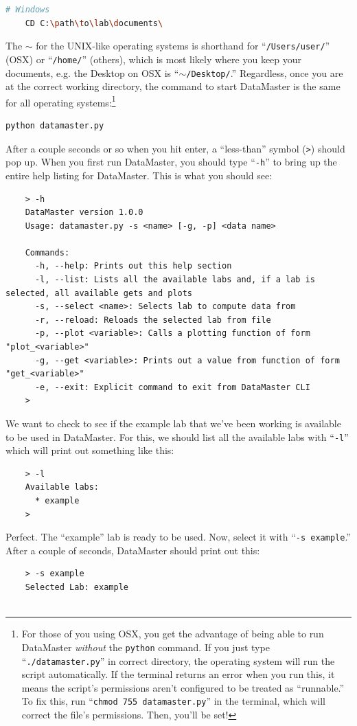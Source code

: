 \documentclass[12pt]{article}
\begin{document}
{\begin{framed}
\begin{lstlisting}[language=sh]
    # Windows
    CD C:\path\to\lab\documents\
  \end{lstlisting}
\end{framed}
The $\sim$ for the UNIX-like operating systems is shorthand for ``\texttt{/Users/user/}'' (OSX) or ``\texttt{/home/}'' (others), which is most likely where you keep your documents, e.g. the Desktop on OSX is ``\texttt{$\sim$/Desktop/}.'' Regardless, once you are at the correct working directory, the command to start DataMaster is the same for all operating systems:\footnote{\textsf{For those of you using OSX, you get the advantage of being able to run DataMaster \textit{without} the \texttt{python} command. If you just type ``\texttt{./datamaster.py}'' in correct directory, the operating system will run the script automatically. If the terminal returns an error when you run this, it means the script's permissions aren't configured to be treated as ``runnable.'' To fix this, run ``\texttt{chmod 755 datamaster.py}'' in the terminal, which will correct the file's permissions. Then, you'll be set!}}
\begin{framed}
  \begin{lstlisting}[language=sh]
    python datamaster.py
  \end{lstlisting}
\end{framed}
After a couple seconds or so when you hit enter, a ``less-than'' symbol (\texttt{>}) should pop up. When you first run DataMaster, you should type ``\texttt{-h}'' to bring up the entire help listing for DataMaster. This is what you should see:
\begin{framed}
  \begin{lstlisting}
    > -h
    DataMaster version 1.0.0
    Usage: datamaster.py -s <name> [-g, -p] <data name>

    Commands:
      -h, --help: Prints out this help section
      -l, --list: Lists all the available labs and, if a lab is selected, all available gets and plots
      -s, --select <name>: Selects lab to compute data from
      -r, --reload: Reloads the selected lab from file
      -p, --plot <variable>: Calls a plotting function of form "plot_<variable>"
      -g, --get <variable>: Prints out a value from function of form "get_<variable>"
      -e, --exit: Explicit command to exit from DataMaster CLI
    > 
  \end{lstlisting}
\end{framed}
We want to check to see if the example lab that we've been working is available to be used in DataMaster. For this, we should list all the available labs with ``\texttt{-l}'' which will print out something like this:
\begin{framed}
  \begin{lstlisting}
    > -l
    Available labs:
      * example
    > 
  \end{lstlisting}
\end{framed}
Perfect. The ``example'' lab is ready to be used. Now, select it with ``\texttt{-s example}.'' After a couple of seconds, DataMaster should print out this:
\begin{framed}
  \begin{lstlisting}
    > -s example
    Selected Lab: example


\end{lstlisting}
\end{framed}}
\end{document}

